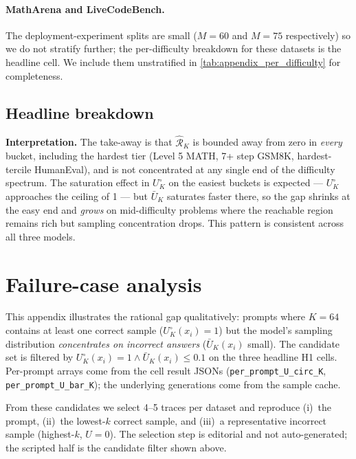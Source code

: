 \paragraph{MathArena and LiveCodeBench.}
The deployment-experiment splits are small ($M{=}60$ and $M{=}75$
respectively) so we do not stratify further; the per-difficulty
breakdown for these datasets is the headline cell. We include them
unstratified in \cref{tab:appendix_per_difficulty} for completeness.

\subsection{Headline breakdown}



\textbf{Interpretation.} The take-away is that $\hat{\mathcal R}_K$ is bounded
away from zero in \emph{every} bucket, including the hardest tier
(Level 5 MATH, 7+ step GSM8K, hardest-tercile HumanEval), and is
not concentrated at any single end of the difficulty spectrum. The
saturation effect in $U^\circ_K$ on the easiest buckets is expected —
$U^\circ_K$ approaches the ceiling of 1 — but $\bar U_K$ saturates faster
there, so the gap shrinks at the easy end and \emph{grows} on
mid-difficulty problems where the reachable region remains rich but
sampling concentration drops. This pattern is consistent across all
three models.

\section{Failure-case analysis}
\label{app:failures}

This appendix illustrates the rational gap qualitatively: prompts where
$K{=}64$ contains at least one correct sample
($U^\circ_K(x_i) = 1$) but the model's sampling distribution
\emph{concentrates on incorrect answers} ($\bar U_K(x_i)$ small).
The candidate set is filtered by
$U^\circ_K(x_i)=1 \land \bar U_K(x_i) \le 0.1$ on the three headline
H1 cells. Per-prompt arrays come from the cell result JSONs
(\texttt{per\_prompt\_U\_circ\_K}, \texttt{per\_prompt\_U\_bar\_K});
the underlying generations come from the sample cache.



From these candidates we select 4--5 traces per dataset and reproduce
(i)~the prompt, (ii)~the lowest-$k$ correct sample, and
(iii)~a representative incorrect sample (highest-$k$, $U=0$). The
selection step is editorial and not auto-generated; the scripted half
is the candidate filter shown above.
